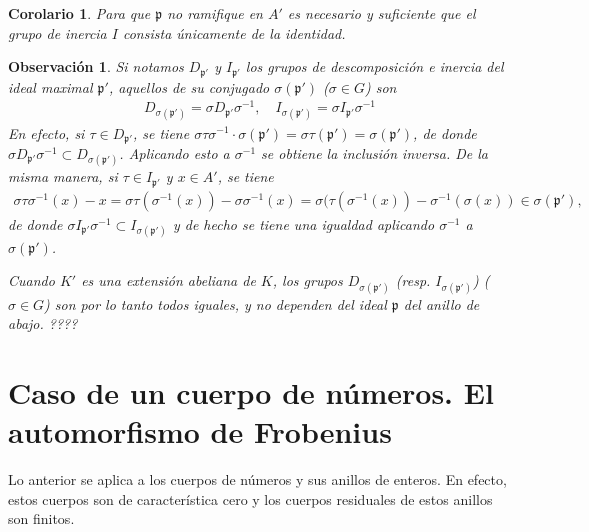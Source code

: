 \documentclass[bibtotoc,leqno,spanish]{amsbook}
\newcommand{\idl}[1]{\mathfrak{#1}}
\numberwithin{equation}{section}
\theoremstyle{note}
\theoremstyle{note}
\newtheorem*{corollary*}{Corolario}
\theoremstyle{rem}
\newtheorem*{remark*}{Observaci\'on}
\numberwithin{theorem}{section}
\numberwithin{proposition}{section}
\numberwithin{definition}{section}
\numberwithin{lemma}{section}
\numberwithin{corollary}{section}
\numberwithin{example}{section}
\numberwithin{footnote}{section}%
\begin{document}
\begin{corollary*}
Para que $\idl{p}$ no ramifique en $A'$ es necesario y suficiente que el grupo de inercia $I$ consista
\'unicamente de la identidad.
\end{corollary*}

\begin{remark*}
Si notamos $D_{\idl{p}'}$ y $I_{\idl{p}'}$ los grupos de descomposici\'on e inercia del ideal maximal
$\idl{p}'$, aquellos de su {\em conjugado} $\sigma(\idl{p}')$ ($\sigma\in G$) son
\begin{gather}
D_{\sigma(\idl{p}')}=\sigma D_{\idl{p}'}\sigma^{-1},\quad I_{\sigma(\idl{p}')}=\sigma I_{\idl{p}'}\sigma^{-1}
\end{gather}
En efecto, si $\tau\in D_{\idl{p}'}$, se tiene $\sigma\tau\sigma^{-1}\cdot\sigma(\idl{p}')=\sigma\tau(\idl{p}')
=\sigma(\idl{p}')$, de donde $\sigma D_{\idl{p}'}\sigma^{-1}\subset D_{\sigma(\idl{p}')}$. Aplicando esto
a $\sigma^{-1}$ se obtiene la inclusi\'on inversa. De la misma manera, si $\tau\in I_{\idl{p}'}$ y $x\in A'$,
se tiene
\begin{gather*}
\sigma\tau\sigma^{-1}(x) - x = \sigma\tau(\sigma^{-1}(x))-\sigma\sigma^{-1}(x)=\sigma(\tau(\sigma^{-1}(x))
-\sigma^{-1}(\sigma(x))\in\sigma(\idl{p}'),
\end{gather*}
de donde $\sigma I_{\idl{p}'}\sigma^{-1}\subset I_{\sigma(\idl{p}')}$ y de hecho se tiene una igualdad
aplicando $\sigma^{-1}$ a $\sigma(\idl{p}')$.

Cuando $K'$ es una extensi\'on {\em abeliana} de $K$, los grupos $D_{\sigma(\idl{p}')}$ (resp.
$I_{\sigma(\idl{p}')}$) ($\sigma\in G$) son por lo tanto todos {\em iguales,} y no dependen del ideal
$\idl{p}$ del anillo de abajo. ????
\end{remark*}

\section{Caso de un cuerpo de n\'umeros. El automorfismo de Frobenius}\label{sec6.3}

Lo anterior se aplica a los cuerpos de n\'umeros y sus anillos de enteros. En efecto, estos cuerpos son de
caracter\'istica cero y los cuerpos residuales de estos anillos son finitos.
\end{document}
